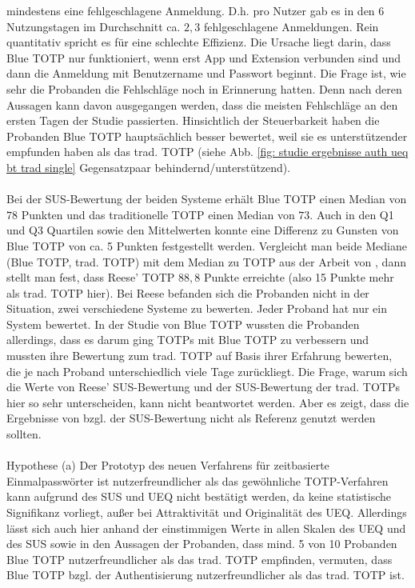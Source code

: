 mindestens eine fehlgeschlagene Anmeldung. D.h. pro Nutzer gab es in den 6 
Nutzungstagen im Durchschnitt ca. $2{,}3$ fehlgeschlagene Anmeldungen. Rein 
quantitativ spricht es für eine schlechte Effizienz. Die Ursache liegt darin, 
dass Blue TOTP nur funktioniert, wenn erst App und Extension verbunden sind 
und dann die Anmeldung mit Benutzername und Passwort beginnt. Die Frage ist, 
wie sehr die Probanden die Fehlschläge noch in Erinnerung hatten. Denn nach 
deren Aussagen kann davon ausgegangen werden, dass die meisten Fehlschläge an 
den ersten Tagen der Studie passierten. Hinsichtlich der Steuerbarkeit haben 
die Probanden Blue TOTP hauptsächlich besser bewertet, weil sie es 
unterstützender empfunden haben als das trad. TOTP (siehe Abb. \ref{fig: 
studie ergebnisse auth ueq bt trad single} Gegensatzpaar behindernd/unterstützend). 
\\\\
Bei der SUS-Bewertung der beiden Systeme erhält Blue TOTP einen Median von 
$78$ Punkten und das traditionelle TOTP einen Median von $73$. Auch in den Q1 
und Q3 Quartilen sowie den Mittelwerten konnte eine Differenz zu Gunsten von 
Blue TOTP von ca. 5 Punkten festgestellt werden. Vergleicht man beide Mediane 
(Blue TOTP, trad. TOTP) mit dem Median zu TOTP aus der Arbeit von 
\textcite{Reese}, dann stellt man fest, dass Reese’ TOTP $88{,}8$ Punkte 
erreichte (also 15 Punkte mehr als trad. TOTP hier). Bei Reese befanden sich 
die Probanden nicht in der Situation, zwei verschiedene Systeme zu bewerten. 
Jeder Proband hat nur ein System bewertet. In der Studie von Blue TOTP wussten 
die Probanden allerdings, dass es darum ging TOTPs mit Blue TOTP zu verbessern 
und mussten ihre Bewertung zum trad. TOTP auf Basis ihrer Erfahrung bewerten, 
die je nach Proband unterschiedlich viele Tage zurückliegt. Die Frage, warum 
sich die Werte von Reese' SUS-Bewertung und der SUS-Bewertung der trad. TOTPs 
hier so sehr unterscheiden, kann nicht beantwortet werden. Aber es zeigt, dass 
die Ergebnisse von \textcite{Reese} bzgl. der SUS-Bewertung nicht als Referenz 
genutzt werden sollten.
\\\\
Hypothese (a) \glqq Der Prototyp des neuen Verfahrens für zeitbasierte 
Einmalpasswörter ist nutzerfreundlicher als das gewöhnliche 
TOTP-Verfahren\grqq{} kann aufgrund des SUS und UEQ nicht bestätigt werden, da 
keine statistische Signifikanz vorliegt, außer bei Attraktivität und 
Originalität des UEQ. Allerdings lässt sich auch hier anhand der einstimmigen 
Werte in allen Skalen des UEQ und des SUS sowie in den Aussagen der Probanden, 
dass mind. 5 von 10 Probanden Blue TOTP nutzerfreundlicher als das trad. TOTP 
empfinden, vermuten, dass Blue TOTP bzgl. der Authentisierung 
nutzerfreundlicher als das trad. TOTP ist.
